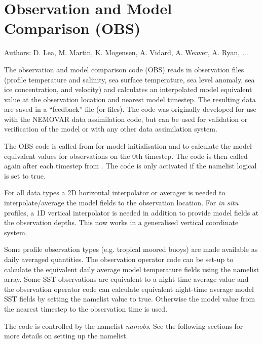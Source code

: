 \documentclass[../main/NEMO_manual]{subfiles}
\begin{document}
\chapter{Observation and Model Comparison (OBS)}
\label{chap:OBS}

Authors: D. Lea, M. Martin, K. Mogensen, A. Vidard, A. Weaver, A. Ryan, ...   %

\minitoc

\newpage

The observation and model comparison code (OBS) reads in observation files
(profile temperature and salinity, sea surface temperature, sea level anomaly, sea ice concentration, and velocity) and calculates an interpolated model equivalent value at the observation location and nearest model timestep.
The resulting data are saved in a ``feedback'' file (or files).
The code was originally developed for use with the NEMOVAR data assimilation code,
but can be used for validation or verification of the model or with any other data assimilation system.

The OBS code is called from  for model initialisation and to calculate the model equivalent values for observations on the 0th timestep.
The code is then called again after each timestep from .
The code is only activated if the namelist logical  is set to true.

For all data types a 2D horizontal interpolator or averager is needed to
interpolate/average the model fields to the observation location.
For {\em in situ} profiles, a 1D vertical interpolator is needed in addition to
provide model fields at the observation depths.
This now works in a generalised vertical coordinate system. 

Some profile observation types (e.g. tropical moored buoys) are made available as daily averaged quantities.
The observation operator code can be set-up to calculate the equivalent daily average model temperature fields using
the  namelist array.
Some SST observations are equivalent to a night-time average value and
the observation operator code can calculate equivalent night-time average model SST fields by
setting the namelist value  to true.
Otherwise the model value from the nearest timestep to the observation time is used.

The code is controlled by the namelist \textit{namobs}.
See the following sections for more details on setting up the namelist.
\end{document}
